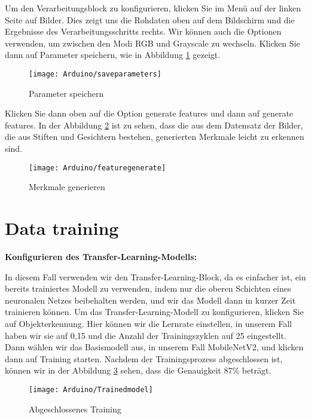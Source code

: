 	Um den Verarbeitungsblock zu konfigurieren, klicken Sie im Menü auf der linken Seite auf Bilder. Dies zeigt uns die Rohdaten oben auf dem Bildschirm und die Ergebnisse des Verarbeitungsschritts rechts. Wir können auch die Optionen verwenden, um zwischen den Modi \glqq RGB\grqq{} und \glqq Grayscale\grqq{} zu wechseln. Klicken Sie dann auf Parameter speichern, wie in Abbildung \ref{EdgeImpulseSave} gezeigt. 
	
	\begin{figure}[H]
		\centering
		\texttt{[image: Arduino/saveparameters]}
		\caption{Parameter speichern}
		\label{EdgeImpulseSave}
	\end{figure}
	
	Klicken Sie dann oben auf die Option \glqq generate features\grqq{} und dann auf \glqq generate features\grqq{}. In der Abbildung \ref{EdgeImpulseGenerateFeature} ist zu sehen, dass die aus dem Datensatz der Bilder, die aus Stiften und Gesichtern bestehen, generierten Merkmale leicht zu erkennen sind.
	
	\begin{figure}[H]
		\centering
		\texttt{[image: Arduino/featuregenerate]}
		\caption{Merkmale generieren}
		\label{EdgeImpulseGenerateFeature}
	\end{figure}
	
	\section{Data training}
	
	\textbf{Konfigurieren des Transfer-Learning-Modells:}
	
	In diesem Fall verwenden wir den Transfer-Learning-Block, da es einfacher ist, ein bereits trainiertes Modell zu verwenden, indem nur die oberen Schichten eines neuronalen Netzes beibehalten werden, und wir das Modell dann in kurzer Zeit trainieren können. Um das Transfer-Learning-Modell zu konfigurieren, klicken Sie auf Objekterkennung. Hier können wir die Lernrate einstellen, in unserem Fall haben wir sie auf 0,15 und die Anzahl der Trainingszyklen auf 25 eingestellt. Dann wählen wir das Basismodell aus, in unserem Fall MobileNetV2, und klicken dann auf Training starten.  Nachdem der Trainingsprozess abgeschlossen ist, können wir in der Abbildung \ref{EdgeImpulseCompletedTraining} sehen, dass die Genauigkeit 87\% beträgt.
	
	\begin{figure}[H]
		\centering
		\texttt{[image: Arduino/Trainedmodel]}
		\caption{Abgeschlossenes Training}
		\label{EdgeImpulseCompletedTraining}
	\end{figure}
	
